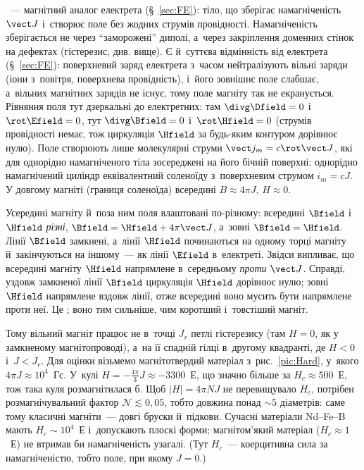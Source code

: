 ~--- магнітний аналог електрета (\S~\ref{sec:FE}): тіло, що зберігає намагніченість $\vect J$ і~створює поле без жодних струмів провідності. Намагніченість зберігається не через \enquote{заморожені} диполі, а~через закріплення доменних стінок на дефектах (гістерезис, див. вище).
Є й~суттєва відмінність від електрета (\S~\ref{sec:FE}): поверхневий заряд електрета з~часом нейтралізують вільні заряди (іони з~повітря, поверхнева провідність), і~його зовнішнє поле слабшає, а~вільних магнітних зарядів не існує, тому поле магніту так не екранується. Рівняння поля тут дзеркальні до електретних: там $\divg\Dfield=0$ і~$\rot\Efield=0$, тут $\divg\Bfield=0$ і~$\rot\Hfield=0$ (струмів провідності немає, тож циркуляція $\Hfield$ за будь-яким контуром дорівнює нулю).
Поле створюють лише молекулярні струми $\vect j_m=c\rot\vect J$, які для однорідно намагніченого тіла зосереджені на його бічній поверхні: однорідно намагнічений циліндр еквівалентний соленоїду з~поверхневим струмом $i_m=cJ$. У довгому магніті (границя соленоїда) всередині $B\approx4\pi J$, $H\approx0$.

Усередині магніту й~поза ним поля влаштовані по-різному: всередині $\Bfield$ і~$\Hfield$ \emph{різні}, $\Bfield=\Hfield+4\pi\vect J$, а~зовні $\Bfield=\Hfield$.
Лінії $\Bfield$ замкнені, а~лінії $\Hfield$ починаються на одному торці магніту й~закінчуються на іншому~--- як лінії $\Efield$ в~електреті.
Звідси випливає, що всередині магніту $\Hfield$ напрямлене в~середньому \emph{проти} $\vect J$. Справді, уздовж замкненої лінії $\Bfield$ циркуляція $\Hfield$ дорівнює нулю; зовні $\Hfield$ напрямлене вздовж лінії, отже всередині воно мусить бути напрямлене проти неї. Це ; воно тим сильніше, чим коротший і~товстіший магніт.

Тому вільний магніт працює не в~точці $J_r$ петлі гістерезису (там $H=0$, як у замкненому магнітопроводі), а~на її спадній гілці в~другому квадранті, де $H<0$ і~$J<J_r$. Для оцінки візьмемо магнітотвердий матеріал з~рис.~\ref{pic:Hard}, у~якого $4\pi J\approx10^4$~Гс. У~кулі $H=-\tfrac{4\pi}{3}J\approx-3300$~Е, що значно більше за $H_c\approx500$~Е, тож така куля розмагнітилася б. Щоб $|H|=4\pi NJ$ не перевищувало $H_c$, потрібен розмагнічувальний фактор $\mathcal N\lesssim0{,}05$, тобто довжина понад $\sim5$ діаметрів: саме тому класичні магніти~--- довгі бруски й~підкови. Сучасні матеріали Nd--Fe--B мають $H_c\sim10^4$~Е і~допускають плоскі форми; магнітом'який матеріал ($H_c\approx1$~Е) не втримав би намагніченість узагалі. (Тут $H_c$~--- коерцитивна сила за намагніченістю, тобто поле, при якому $J=0$.)

